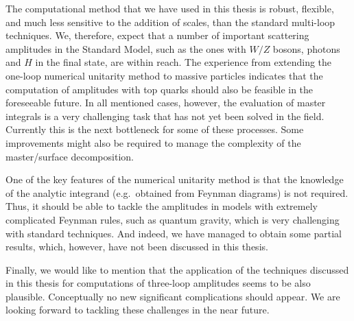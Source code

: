 The computational method that we have used in this thesis is robust, flexible,
and much less sensitive to the addition of scales, than the standard multi-loop techniques.
We, therefore, expect that a number of important scattering amplitudes
in the Standard Model, such as the ones with $W/Z$ bosons, photons and $H$ in the final state, are within reach.
The experience from extending the one-loop numerical unitarity method to massive particles indicates that
the computation of amplitudes with top quarks should also be feasible in the foreseeable future.
In all mentioned cases, however, the evaluation of master integrals is a very challenging task that has not yet been solved in the field.
Currently this is the next bottleneck for some of these processes.
Some improvements might also be required to manage the complexity of the master/surface decomposition.

One of the key features of the numerical unitarity method is that the knowledge of the analytic integrand (e.g.\ obtained from Feynman diagrams) is not required.
Thus, it should be able to tackle the amplitudes in models with extremely complicated Feynman rules, such as quantum gravity,
which is very challenging with standard techniques.
And indeed, we have managed to obtain some partial results, which, however, have not been discussed in this thesis.

Finally, we would like to mention that the application of the techniques discussed in this thesis for computations of three-loop amplitudes seems to
be also plausible. Conceptually no new significant complications should appear.
We are looking forward to tackling these challenges in the near future.




